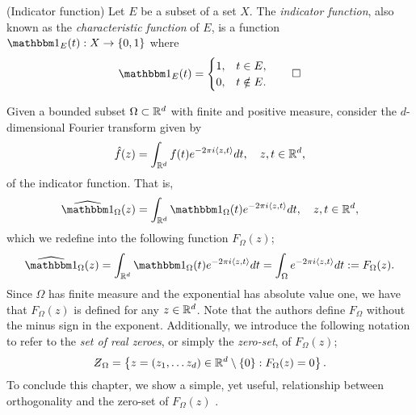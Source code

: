 \documentclass[../thesis.tex]{subfiles}
\begin{document}
\begin{definition}(Indicator function)\label{def:indicator}
    Let $E$ be a subset of a set $X$. The \emph{indicator function}, also known as the \emph{characteristic function} of $E$, is a function $\indicator{E}{t}: X \rightarrow \braq{0,1}$ where
    \begin{equation*}
        \indicator{E}{t}  = 
        \begin{cases} 
            1, &  t\in E,\\
            0, &  t \notin E.
        \end{cases}
        \qedhere
    \end{equation*}
\end{definition}

Given a bounded subset $\Omega\subset \mathbb{R}^d$ with finite and positive measure, consider the $d$-dimensional Fourier transform given by
\begin{equation*}
    \hat{f}(z) = \int_{\mathbb{R}^d} f(t)  e^{-2\pi i \langle z,t\rangle} dt, \quad z,t\in \mathbb{R}^d,
\end{equation*}
of the indicator function. That is, 
\begin{equation*}
    \indicatorFourier{\Omega}{z} = \int_{\R^d} \indicator{\Omega}{t}  e^{-2\pi i \braa{z,t}} dt, \quad z,t\in \R^d,
\end{equation*} 
which we redefine into the following function $F_{\Omega}(z)$;
\begin{equation}\label{eq:f_omega}
    \indicatorFourier{\Omega}{z} = \int_{\R^d} \indicator{\Omega}{t}  e^{-2\pi i \braa{z,t}} dt = \int_{\Omega} e^{-2\pi i \braa{z,t}} dt := F_{\Omega}(z).
\end{equation}
Since $\Omega$ has finite measure and the exponential has absolute value one, we have that $F_{\Omega}(z)$ is defined for any $z \in \mathbb{R}^d$. Note that the authors \cite{jorgensenSpectralPairsCartesian2001} define $F_{\Omega}$ without the minus sign in the exponent. Additionally, we introduce the following notation to refer to the \emph{set of real zeroes}, or simply the \emph{zero-set}, of $F_{\Omega}(z)$;
\begin{equation*}
    \Zstroke_{\Omega} = \braqMed{ z  = (z_1, \dots z_d) \in \R^d \setminus \braqMed{0} : F_{\Omega}(z)= 0}.
\end{equation*}
To conclude this chapter, we show a simple, yet useful, relationship between orthogonality and the zero-set of $F_{\Omega}(z)$ \cite{lagariasOrthonormalBasesExponentials2000,jorgensenSpectralPairsCartesian2001}. %
\end{document}
